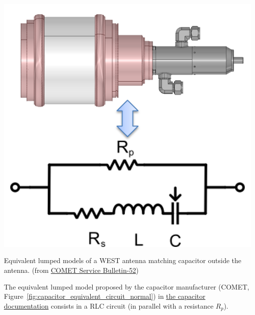 {\begin{marginfigure}[-5cm]
	\centering
	\includegraphics[width=1.0\linewidth]{figures/chap3/WEST_ICRH/capacitor_equivalent_circuit_normal}
	\caption{Equivalent lumped models of a WEST antenna matching capacitor outside the antenna. (from 	\href{https://www.comet-pct.com/getmedia/fb744f1b-1125-4c91-8af3-e058fa56a3bd/SB-52_Technical_Recommendations_and_General_Instructions_for_Vacuum_Capacitors.aspx}{COMET Service Bulletin-52})}
	\label{fig:capacitor_equivalent_circuit_normal}	  
\end{marginfigure}

The equivalent lumped model proposed by the capacitor manufacturer (COMET, Figure~\ref{fig:capacitor_equivalent_circuit_normal}) in \href{https://www.comet-pct.com/getmedia/fb744f1b-1125-4c91-8af3-e058fa56a3bd/SB-52_Technical_Recommendations_and_General_Instructions_for_Vacuum_Capacitors.aspx}{the capacitor documentation} consists in a RLC circuit (in parallel with a resistance $R_p$). 


}
